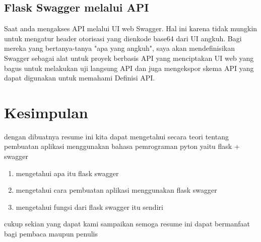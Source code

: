 \documentclass[12pt]{article}
\begin{document}
\subsection{Flask Swagger melalui API}
Saat anda mengakses API melalui UI web Swagger. Hal ini karena tidak mungkin untuk mengatur header otorisasi yang dienkode base64 dari UI angkuh. Bagi mereka yang bertanya-tanya "apa yang angkuh", saya akan mendefinisikan Swagger sebagai alat untuk proyek berbasis API yang menciptakan UI web yang bagus untuk melakukan uji langsung API dan juga mengekspor skema API yang dapat digunakan untuk memahami Definisi API.


\section{Kesimpulan}
dengan dibuatnya resume ini kita dapat mengetahui secara teori tentang pembuatan aplikasi menggunakan bahasa pemrograman pyton yaitu flask + swagger 
\begin{enumerate}
\item mengetahui apa itu flask swagger
\item mengetahui cara pembuatan aplikasi menggunakan flask swagger
\item mengetahui fungsi dari flask swagger itu sendiri
\end{enumerate}	
cukup sekian yang dapat kami sampaikan semoga resume ini dapat bermanfaat  bagi pembaca maupun penulis 
\end{document}
